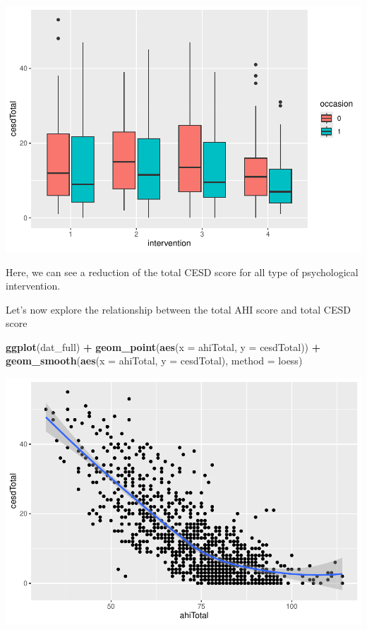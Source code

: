 \documentclass[
]{article}
\newenvironment{Shaded}{\begin{snugshade}}{\end{snugshade}}
\newcommand{\AttributeTok}[1]{\textcolor[rgb]{0.13,0.29,0.53}{#1}}
\newcommand{\FunctionTok}[1]{\textcolor[rgb]{0.13,0.29,0.53}{\textbf{#1}}}
\newcommand{\NormalTok}[1]{#1}
\newcommand{\SpecialCharTok}[1]{\textcolor[rgb]{0.81,0.36,0.00}{\textbf{#1}}}
\newcommand{\StringTok}[1]{\textcolor[rgb]{0.31,0.60,0.02}{#1}}
\begin{document}
\includegraphics{RealData_example_files/figure-latex/unnamed-chunk-10-1.pdf}

Here, we can see a reduction of the total CESD score for all type of
psychological intervention.

Let's now explore the relationship between the total AHI score and total
CESD score

\begin{Shaded}
\begin{Highlighting}[]
\FunctionTok{ggplot}\NormalTok{(dat\_full) }\SpecialCharTok{+}
  \FunctionTok{geom\_point}\NormalTok{(}\FunctionTok{aes}\NormalTok{(}\AttributeTok{x =}\NormalTok{ ahiTotal, }\AttributeTok{y =}\NormalTok{ cesdTotal)) }\SpecialCharTok{+}
  \FunctionTok{geom\_smooth}\NormalTok{(}\FunctionTok{aes}\NormalTok{(}\AttributeTok{x =}\NormalTok{ ahiTotal, }\AttributeTok{y =}\NormalTok{ cesdTotal), }\AttributeTok{method =} \StringTok{\textquotesingle{}loess\textquotesingle{}}\NormalTok{)}
\end{Highlighting}
\end{Shaded}

\includegraphics{RealData_example_files/figure-latex/unnamed-chunk-11-1.pdf}
\end{document}
